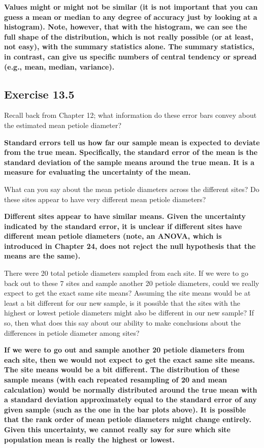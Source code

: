 \documentclass[
  openany]{scrbook}
\begin{document}
\textbf{Values might or might not be similar (it is not important that you can guess a mean or median to any degree of accuracy just by looking at a histogram). Note, however, that with the histogram, we can see the full shape of the distribution, which is not really possible (or at least, not easy), with the summary statistics alone. The summary statistics, in contrast, can give us specific numbers of central tendency or spread (e.g., mean, median, variance).}

\hypertarget{exercise-13.5}{%
\subsection{Exercise 13.5}\label{exercise-13.5}}

Recall back from Chapter 12; what information do these error bars convey about the estimated mean petiole diameter?

\textbf{Standard errors tell us how far our sample mean is expected to deviate from the true mean. Specifically, the standard error of the mean is the standard deviation of the sample means around the true mean. It is a measure for evaluating the uncertainty of the mean.}

What can you say about the mean petiole diameters across the different sites? Do these sites appear to have very different mean petiole diameters?

\textbf{Different sites appear to have similar means. Given the uncertainty indicated by the standard error, it is unclear if different sites have different mean petiole diameters (note, an ANOVA, which is introduced in Chapter 24, does not reject the null hypothesis that the means are the same).}

There were 20 total petiole diameters sampled from each site. If we were to go back out to these 7 sites and sample another 20 petiole diameters, could we really expect to get the exact same site means? Assuming the site means would be at least a bit different for our new sample, is it possible that the sites with the highest or lowest petiole diameters might also be different in our new sample? If so, then what does this say about our ability to make conclusions about the differences in petiole diameter among sites?

\textbf{If we were to go out and sample another 20 petiole diameters from each site, then we would not expect to get the exact same site means. The site means would be a bit different. The distribution of these sample means (with each repeated resampling of 20 and mean calculation) would be normally distributed around the true mean with a standard deviation approximately equal to the standard error of any given sample (such as the one in the bar plots above). It is possible that the rank order of mean petiole diameters might change entirely. Given this uncertainty, we cannot really say for sure which site population mean is really the highest or lowest.}
\end{document}
